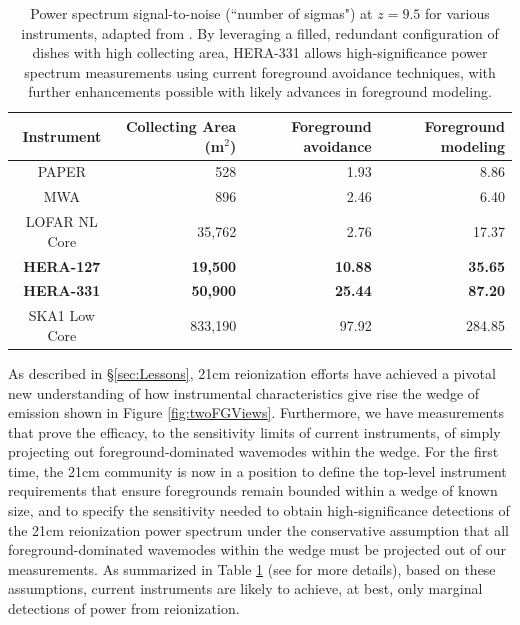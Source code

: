\documentclass[preprint]{aastex}
\begin{document}

\begin{table}[t]
\centering
\begin{tabular}{c||r||r|r} 
Instrument & Collecting Area (m$^2$) & Foreground avoidance & Foreground modeling \\
\hline
PAPER & 528 & 1.93 & 8.86 \\
MWA & 896 & 2.46 & 6.40 \\
LOFAR NL Core & 35,762 & 2.76 & 17.37 \\
\textbf{HERA-127} & \textbf{19,500} & \textbf{10.88} & \textbf{35.65} \\
\textbf{HERA-331} & \textbf{50,900} & \textbf{25.44} & \textbf{87.20} \\
SKA1 Low Core & 833,190 & 97.92 & 284.85 \\
\end{tabular}
\caption{\small
Power spectrum signal-to-noise (``number of sigmas") at $z=9.5$ for various instruments, adapted from \citet{pober_et_al2014}.  By leveraging a filled, redundant configuration of dishes with high collecting area, HERA-331 allows high-significance power spectrum measurements using current foreground avoidance techniques, with further enhancements possible with likely advances in foreground modeling.}
\label{tab:signif}
\end{table}


As described in \S\ref{sec:Lessons}, 21cm reionization efforts have achieved a
pivotal new understanding of how instrumental characteristics give rise the
wedge of emission shown in Figure \ref{fig:twoFGViews}.  Furthermore, we have
measurements that prove the efficacy, to the sensitivity limits of current
instruments, of simply projecting out foreground-dominated wavemodes within the
wedge.  For the first time, the 21cm community is now in a position to define
the top-level instrument requirements that ensure foregrounds remain bounded
within a wedge of known size, and to specify the sensitivity needed to obtain
high-significance detections of the 21cm reionization power spectrum under the
conservative assumption that all foreground-dominated wavemodes within the
wedge must be projected out of our measurements.
As summarized in Table \ref{tab:signif} (see \citealt{pober_et_al2014} for more details),
based on these assumptions, current instruments are likely to achieve,
at best, only marginal detections of power from reionization.
\end{document}
